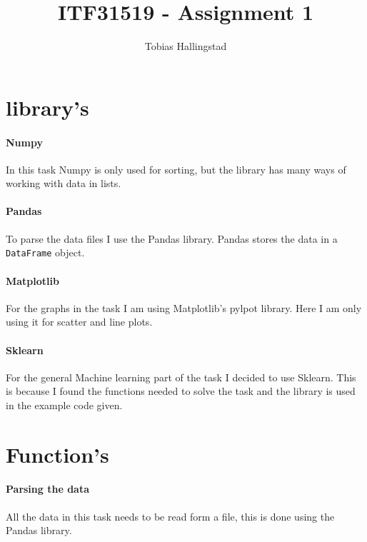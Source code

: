 \documentclass[11pt]{article}
\title{ITF31519 - Assignment 1}
\author{Tobias Hallingstad}
\begin{document}
    \begin{titlepage}
        \maketitle
    \end{titlepage}

        
    \section{library's}
        \paragraph{Numpy}
        In this task Numpy is only used for sorting, but the library has many ways of working with data in lists.
        
        \paragraph{Pandas} 
        To parse the data files I use the Pandas library. Pandas stores the data in a \texttt{DataFrame} object.
        
        \paragraph{Matplotlib}
        For the graphs in the task I am using Matplotlib's pylpot library. Here I am only using it for scatter and line plots.

        \paragraph{Sklearn}
        For the general Machine learning part of the task I decided to use Sklearn. This is because I found the functions needed to solve the task and the library is used in the example code given.
        
    \section{Function's}
        \paragraph{Parsing the data}
        All the data in this task needs to be read form a file, this is done using the Pandas library.
\end{document}
